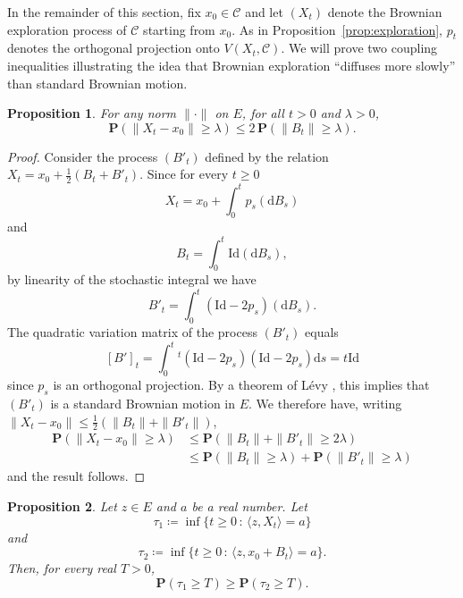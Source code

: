 \documentclass[10pt,a4paper]{amsart}
\renewcommand{\P}{\mathbf{P}}
\newcommand{\scalar}[2]{\langle #1 , #2\rangle}
\renewcommand{\leq}{\leqslant}
\renewcommand{\geq}{\geqslant}
\newtheorem{proposition}{Proposition}
\begin{document}
 
In the remainder of this section, fix $x_0 \in \mathscr{C}$ and let $(X_t)$ denote the Brownian exploration process of $\mathscr{C}$ starting from $x_0$. As in Proposition~\ref{prop:exploration}, $p_t$ denotes the orthogonal projection onto $V(X_t,\mathscr{C})$. We will prove two coupling inequalities illustrating the idea that Brownian exploration ``diffuses more slowly'' than standard Brownian motion.
 
\begin{proposition} \label{prop:maurey}
For any norm $\|\cdot\|$ on $E$, for all $t>0$ and $\lambda > 0$,
\[ \P ( \| X_t-x_0\| \geq \lambda) \leq 2 \, \P ( \|B_t\| \geq \lambda). \]
\end{proposition}
 
\begin{proof}
Consider the process $(B'_t)$ defined by the relation $X_t = x_0 + \frac{1}{2}\left( B_t + B'_t\right)$. Since for every $t \geq 0$
\[ X_t = x_0 + \int_0^t p_s(\mathrm{d}B_s)\]
and
\[ B_t = \int_0^t \mathrm{Id}(\mathrm{d}B_s),\]
by linearity of the stochastic integral we have
\[ B'_t = \int_0^t (\mathrm{Id}-2p_s)(\mathrm{d}B_s).\]
The quadratic variation matrix of the process $(B'_t)$ equals
\[ [B']_t = \int_0^t {^t}(\mathrm{Id}-2p_s)(\mathrm{Id}-2p_s) \mathrm{d}s = t \mathrm{Id}\]
since $p_s$ is an orthogonal projection. By a theorem of L\'evy \cite[Theorem 5.4]{LeGall13}, this implies that $(B'_t)$ is a standard Brownian motion in $E$. We therefore have, writing $\|X_t-x_0\| \leq \frac{1}{2} (\|B_t\|+\|B'_t\|)$,
\begin{align*}
\P  (\| X_t-x_0\| \geq \lambda) & \leq \P  \left(\| B_t \| + \|B'_t\| \geq 2\lambda \right) \\
& \leq \P  ( \| B_t \| \geq \lambda) + \P  ( \| B'_t \| \geq \lambda)
\end{align*}
and the result follows.
\end{proof}
 
\begin{proposition} \label{prop:couplage}
Let $z \in  E$ and $a$ be a real number.
Let
\[ \tau_1 \coloneqq \inf \{ t \geq 0 \, : \, \scalar{z}{X_t} = a \} \]
and
\[ \tau_2 \coloneqq \inf \{ t \geq 0 \, : \, \scalar{z}{x_0+B_t} = a \}. \]
Then, for every real $T > 0$,
\[ \P(\tau_1 \geq T) \geq \P (\tau_2 \geq T) .\]
\end{proposition}
 
\end{document}
